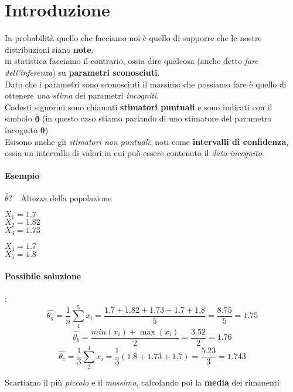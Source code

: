 \documentclass[]{article}
\begin{document}
    \tableofcontents
    \newpage 
    \section{Introduzione}
    In probabilità quello che facciamo noi è quello di supporre che le nostre distribuzioni siano \textbf{note}. \\
    in statistica facciamo il contrario, ossia dire qualcosa (anche detto \textit{fare dell'inferenza}) su \textbf{parametri sconosciuti}. \\
    Dato che i parametri sono sconosciuti il massimo che possiamo fare è quello di ottenere \textit{una stima} dei parametri \textit{incogniti}. \\[2ex]
    Codesti signorini sono chiamati \textbf{stimatori puntuali} e sono indicati con il simbolo $\boldsymbol{\hat{\theta}}$ (in questo caso stiamo parlando di uno stimatore del parametro incognito $\boldsymbol{\theta}$) \\[2ex]
    Esisono anche gli \textit{stimatori non puntuali}, noti come \textbf{intervalli di confidenza}, ossia un intervallo di valori in cui può essere contenuto il \textit{dato incognito}.
    \paragraph{Esempio} $\hat{\theta}? \quad \text{Altezza della popolazione}$ \\[2ex]
    \begin{minipage}{0.49\textwidth}
        $X_1 = 1.7$ \\
        $X_2 = 1.82$ \\
        $X_3 = 1.73$
    \end{minipage}
    \begin{minipage}{0.49\textwidth}
        $X_4 = 1.7$ \\
        $X_5 = 1.8$ \\
    \end{minipage}
    \paragraph{Possibile soluzione}: 
    \[ \hat{\theta_a} = \frac{1}{n} \sum_{4}^{5} x_i = \frac{1.7 + 1.82 + 1.73 + 1.7 + 1.8}{5} = \frac{8.75}{5} = 1.75 \]
    \[ \hat{\theta_b} = \frac{min(x_i) + \max(x_i)}{2} = \frac{3.52}{2} = 1.76 \]
    \[ \hat{\theta_c} = \frac{1}{3} \sum_{2}^{4} x_i = \frac{1}{3} (1.8 + 1.73 + 1.7) = \frac{5.23}{3} = 1.743 \]
    \centerline{Scartiamo il più \textit{piccolo} e il \textit{massimo}, calcolando poi la \textbf{media} dei rimanenti}
\end{document}
